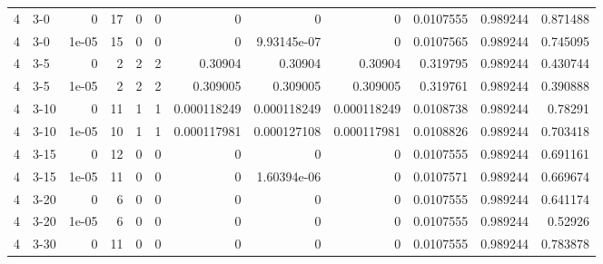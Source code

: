 \begin{tabular}{rlrrrrrrrrrr}
     4 & 3-0    &      0     &          17 &                 0 &                 0 &     0           &     0           &      0           &        0.0107555 &               0.989244 &           0.871488 \\
     4 & 3-0    &      1e-05 &          15 &                 0 &                 0 &     0           &     9.93145e-07 &      0           &        0.0107565 &               0.989244 &           0.745095 \\
     4 & 3-5    &      0     &           2 &                 2 &                 2 &     0.30904     &     0.30904     &      0.30904     &        0.319795  &               0.989244 &           0.430744 \\
     4 & 3-5    &      1e-05 &           2 &                 2 &                 2 &     0.309005    &     0.309005    &      0.309005    &        0.319761  &               0.989244 &           0.390888 \\
     4 & 3-10   &      0     &          11 &                 1 &                 1 &     0.000118249 &     0.000118249 &      0.000118249 &        0.0108738 &               0.989244 &           0.78291  \\
     4 & 3-10   &      1e-05 &          10 &                 1 &                 1 &     0.000117981 &     0.000127108 &      0.000117981 &        0.0108826 &               0.989244 &           0.703418 \\
     4 & 3-15   &      0     &          12 &                 0 &                 0 &     0           &     0           &      0           &        0.0107555 &               0.989244 &           0.691161 \\
     4 & 3-15   &      1e-05 &          11 &                 0 &                 0 &     0           &     1.60394e-06 &      0           &        0.0107571 &               0.989244 &           0.669674 \\
     4 & 3-20   &      0     &           6 &                 0 &                 0 &     0           &     0           &      0           &        0.0107555 &               0.989244 &           0.641174 \\
     4 & 3-20   &      1e-05 &           6 &                 0 &                 0 &     0           &     0           &      0           &        0.0107555 &               0.989244 &           0.52926  \\
     4 & 3-30   &      0     &          11 &                 0 &                 0 &     0           &     0           &      0           &        0.0107555 &               0.989244 &           0.783878 \\

\end{tabular}
